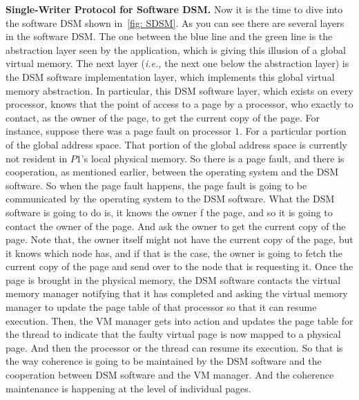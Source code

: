 \documentclass[11pt]{lecture}
\begin{document}
\noindent
{\bf Single-Writer Protocol for Software DSM.} Now it is the time to dive into the software DSM shown in~\autoref{fig: SDSM}. 
As you can see there are several layers in the software DSM. The one between the blue line and the green line 
is the abstraction layer seen by the application, which is giving this illusion of a global virtual memory. The 
next layer ({\it i.e.,} the next one below the abstraction layer) is the DSM software implementation layer, 
which implements this global virtual memory abstraction. In particular, this DSM software layer, which 
exists on every processor, knows that the point of access to a page by a processor, who exactly to contact, as 
the owner of the page, to get the current copy of the page. For instance, suppose there was a page fault 
on processor $1$. For a particular portion of the global address space. That portion of the global address space 
is currently not resident in $P1$'s local physical memory. So there is a page fault, and there is cooperation, as 
mentioned earlier, between the operating system and the DSM software. So when the page fault happens, the page fault is 
going to be communicated by the operating system to the DSM software. What the DSM software is going to do is, it knows 
the owner f the page, and so it is going to contact the owner of the page. And ask the owner to get the current 
copy of the page. Note that, the owner itself might not have the current copy of the page, but it knows which 
node has, and if that is the case, the owner is going to fetch the current copy of the page and 
send over to the node that is requesting it. Once the page is brought in the physical memory, the DSM 
software contacts the virtual memory manager notifying that it has completed and asking the virtual 
memory manager to update the page table of that processor so that it can resume execution. Then, 
the VM manager gets into action and updates the page table for the thread to indicate that the faulty virtual page is 
now mapped to a physical page. And then the processor or the thread can resume its execution. So that is the way 
coherence is going to be maintained by the DSM software and the cooperation between DSM software and the VM 
manager. And the coherence maintenance is happening at the level of individual pages. 
\end{document}

